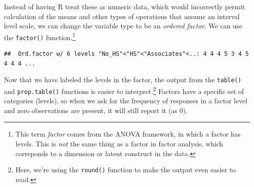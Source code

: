 \documentclass[
]{article}
\newenvironment{Shaded}{\begin{snugshade}}{\end{snugshade}}
\newcommand{\DataTypeTok}[1]{\textcolor[rgb]{0.13,0.29,0.53}{#1}}
\newcommand{\KeywordTok}[1]{\textcolor[rgb]{0.13,0.29,0.53}{\textbf{#1}}}
\newcommand{\NormalTok}[1]{#1}
\newcommand{\OperatorTok}[1]{\textcolor[rgb]{0.81,0.36,0.00}{\textbf{#1}}}
\newcommand{\OtherTok}[1]{\textcolor[rgb]{0.56,0.35,0.01}{#1}}
\newcommand{\StringTok}[1]{\textcolor[rgb]{0.31,0.60,0.02}{#1}}
\begin{document}
Instead of having R treat these as numeric data, which would incorrectly permit calculation of the means and other types of operations that assume an interval level scale, we can change the variable type to be an \emph{ordered factor}. We can use the \texttt{factor()} function.\footnote{This term \emph{factor} comes from the ANOVA framework, in which a factor has levels. This is \emph{not} the same thing as a factor in factor analysis, which correponds to a dimension or latent construct in the data.}

\begin{Shaded}
\end{Shaded}

\begin{verbatim}
##  Ord.factor w/ 6 levels "No_HS"<"HS"<"Associates"<..: 4 4 4 5 3 4 5 4 4 4 ...
\end{verbatim}

Now that we have labeled the levels in the factor, the output from the \texttt{table()} and \texttt{prop.table()} functions is easier to interpret.\footnote{Here, we're using the \texttt{round()} function to make the output even easier to read.} Factors have a specific set of categories (levels), so when we ask for the frequency of responses in a factor level and zero observations are present, it will still report it (as \(0\)).
\end{document}
